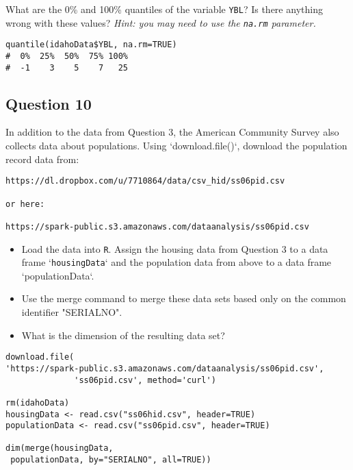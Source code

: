 \documentclass[]{article}
\begin{document}
What are the 0\% and 100\% quantiles of the variable \texttt{YBL}? Is there anything wrong with these values?
\textit{ Hint: you may need to use the \texttt{na.rm} parameter.}

\begin{framed} 
\begin{verbatim}
quantile(idahoData$YBL, na.rm=TRUE)
#  0%  25%  50%  75% 100% 
#  -1    3    5    7   25 
\end{verbatim}
\end{framed} 

\newpage
\subsection*{Question 10}

In addition to the data from Question 3, the American Community Survey also collects data about populations. 
Using `download.file()`, download the population record data from: 

\begin{verbatim}
https://dl.dropbox.com/u/7710864/data/csv_hid/ss06pid.csv 

or here:

https://spark-public.s3.amazonaws.com/dataanalysis/ss06pid.csv
\end{verbatim}

\begin{itemize}
\item Load the data into \texttt{R}. Assign the housing data from Question 3 to a data frame `\texttt{housingData}` and the population data from above to a data frame `populationData`.

\item Use the merge command to merge these data sets based only on the common identifier "SERIALNO". 

\item What is the dimension of the resulting data set? 
\end{itemize}

\begin{framed} 
\begin{verbatim}
download.file(
'https://spark-public.s3.amazonaws.com/dataanalysis/ss06pid.csv',
              'ss06pid.csv', method='curl')

rm(idahoData)
housingData <- read.csv("ss06hid.csv", header=TRUE)
populationData <- read.csv("ss06pid.csv", header=TRUE)

dim(merge(housingData, 
 populationData, by="SERIALNO", all=TRUE))
\end{verbatim}
\end{framed} 

\end{document}
